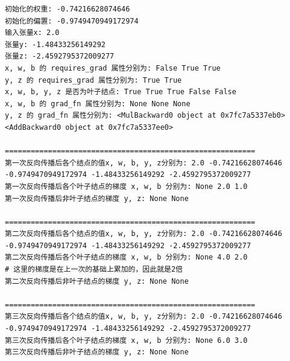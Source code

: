 \begin{lstlisting}[style=demostyle,numbers=none]
初始化的权重: -0.74216628074646 
初始化的偏置: -0.9749470949172974 
输入张量x: 2.0
张量y: -1.48433256149292 
张量z: -2.4592795372009277
x, w, b 的 requires_grad 属性分别为: False True True
y, z 的 requires_grad 属性分别为: True True
x, w, b, y, z 是否为叶子结点: True True True False False
x, w, b 的 grad_fn 属性分别为: None None None
y, z 的 grad_fn 属性分别为: <MulBackward0 object at 0x7fc7a5337eb0> <AddBackward0 object at 0x7fc7a5337ee0>

==========================================================
第一次反向传播后各个结点的值x, w, b, y, z分别为: 2.0 -0.74216628074646 -0.9749470949172974 -1.48433256149292 -2.4592795372009277
第一次反向传播后各个叶子结点的梯度 x, w, b 分别为: None 2.0 1.0
第一次反向传播后非叶子结点的梯度 y, z: None None

==========================================================
第二次反向传播后各个结点的值x, w, b, y, z分别为: 2.0 -0.74216628074646 -0.9749470949172974 -1.48433256149292 -2.4592795372009277
第二次反向传播后各个叶子结点的梯度 x, w, b 分别为: None 4.0 2.0 
# 这里的梯度是在上一次的基础上累加的，因此就是2倍
第二次反向传播后非叶子结点的梯度 y, z: None None

==========================================================
第三次反向传播后各个结点的值x, w, b, y, z分别为: 2.0 -0.74216628074646 -0.9749470949172974 -1.48433256149292 -2.4592795372009277
第三次反向传播后各个叶子结点的梯度 x, w, b 分别为: None 6.0 3.0
第三次反向传播后非叶子结点的梯度 y, z: None None
\end{lstlisting}

